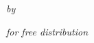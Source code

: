 
\vspace*{20mm}

{\centering
\shakerLight

\titleLogo
\bigskip

\textit{by \theauthor}

\vfill

\textit{for free distribution}



%

}
